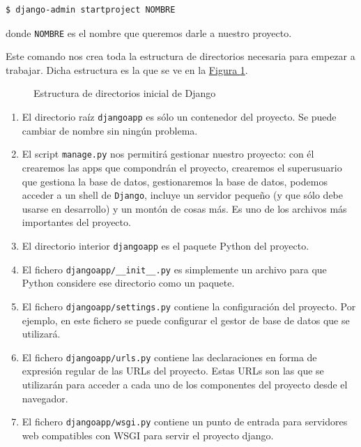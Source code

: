 \begin{verbatim}
$ django-admin startproject NOMBRE
\end{verbatim}

donde \texttt{NOMBRE} es el nombre que queremos darle a nuestro proyecto.

Este comando nos crea toda la estructura de directorios necesaria para empezar a trabajar. Dicha estructura es la que se ve en la \hyperref[djangoprojectfolders]{Figura \ref*{djangoprojectfolders}}.

\begin{figure}
\centering
\scalebox{.7}{}
\caption{Estructura de directorios inicial de Django}
\label{djangoprojectfolders}
\end{figure}

\begin{enumerate}[---]
	\item El directorio raíz \texttt{djangoapp} es sólo un contenedor del proyecto. Se puede cambiar de nombre sin ningún problema.
	\item El script \texttt{manage.py} nos permitirá gestionar nuestro proyecto: con él crearemos las apps que compondrán el proyecto, crearemos el superusuario que gestiona la base de datos, gestionaremos la base de datos, podemos acceder a un shell de \texttt{Django}, incluye un servidor pequeño (y que sólo debe usarse en desarrollo) y un montón de cosas más. Es uno de los archivos más importantes del proyecto.
	\item El directorio interior \texttt{djangoapp} es el paquete Python del proyecto.
	\item El fichero \texttt{djangoapp/\_\_init\_\_.py} es simplemente un archivo para que Python considere ese directorio como un paquete.
	\item El fichero \texttt{djangoapp/settings.py} contiene la configuración del proyecto. Por ejemplo, en este fichero se puede configurar el gestor de base de datos que se utilizará.
	\item El fichero \texttt{djangoapp/urls.py} contiene las declaraciones en forma de expresión regular de las URLs del proyecto. Estas URLs son las que se utilizarán para acceder a cada uno de los componentes del proyecto desde el navegador.
	\item El fichero \texttt{djangoapp/wsgi.py} contiene un punto de entrada para servidores web compatibles con WSGI para servir el proyecto django.
\end{enumerate}

